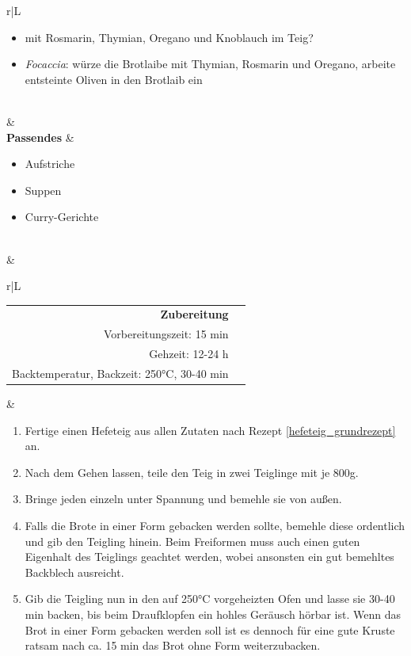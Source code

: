 \documentclass[a4paper, 12pt]{scrbook} 								%
\numberwithin{equation}{section} 									%
\begin{document}
\begin{tabularx}{\textwidth}{r|L}
\begin{itemize}[nosep]
										\item mit Rosmarin, Thymian, Oregano und Knoblauch im Teig?
										\item \emph{Focaccia}: würze die Brotlaibe mit Thymian, Rosmarin und Oregano, arbeite entsteinte Oliven in den Brotlaib ein
									\end{itemize}	\\
								&	\\	
		\textbf{Passendes}		&	\begin{itemize}[nosep]
										\item Aufstriche
										\item Suppen
										\item Curry-Gerichte
									\end{itemize}	\\
								&	\\	
		\end{tabularx}
		\newpage
		\begin{tabularx}{\textwidth}{r|L}
	
	
		\begin{tabular}[t]{rr}
			\textbf{Zubereitung}	\\
			Vorbereitungszeit: 15 min	\\
			Gehzeit: 12-24 h	\\
			Backtemperatur, Backzeit: 250°C, 30-40 min \\
		\end{tabular}			&	\begin{enumerate}[nosep]
										\item Fertige einen Hefeteig aus allen Zutaten nach Rezept \ref{hefeteig_grundrezept} an.
										\item Nach dem Gehen lassen, teile den Teig in zwei Teiglinge mit je 800g.
										\item Bringe jeden einzeln unter Spannung und bemehle sie von außen.
										\item Falls die Brote in einer Form gebacken werden sollte, bemehle diese ordentlich und gib den Teigling hinein. Beim Freiformen muss auch einen guten Eigenhalt des Teiglings geachtet werden, wobei ansonsten ein gut bemehltes Backblech ausreicht.
										\item Gib die Teigling nun in den auf 250°C vorgeheizten Ofen und lasse sie 30-40 min backen, bis beim Draufklopfen ein hohles Geräusch hörbar ist. Wenn das Brot in einer Form gebacken werden soll ist es dennoch für eine gute Kruste ratsam nach ca. 15 min das Brot ohne Form weiterzubacken.
									\end{enumerate}	\\
	\end{tabularx}
	\newpage
\end{document}
